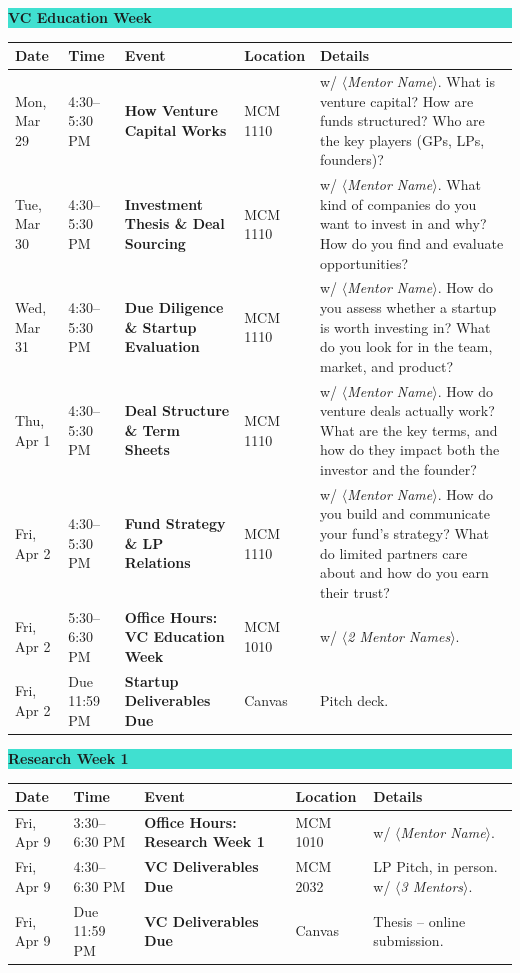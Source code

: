 \documentclass[11pt]{article}
\newcommand{\weekheader}[1]{%
  \vspace{4pt}
  \noindent
  \colorbox{turquoise}{\parbox{\dimexpr\textwidth-2\fboxsep}{\bfseries\large #1}}
  \vspace{6pt}
}
\newcommand{\deliverable}[2]{\colorbox{#1}{\textbf{#2}}}
\newcommand{\entry}[5]{%
  #1 & #2 & \textbf{#3} & #4 & #5 \\
}
\begin{document}
\weekheader{VC Education Week}
\begin{longtable}{L{2.2cm} L{2.2cm} L{4.5cm} L{1.7cm} L{4.7cm}}
\toprule
{}
\textbf{Date} & \textbf{Time} & \textbf{Event} & \textbf{Location} & \textbf{Details} \\
\midrule
\entry{Mon, Mar 29}{4:30--5:30 PM}{How Venture Capital Works}{MCM 1110}{w/ \textit{$\langle$Mentor Name$\rangle$}. What is venture capital? How are funds structured? Who are the key players (GPs, LPs, founders)?}
\addlinespace
\entry{Tue, Mar 30}{4:30--5:30 PM}{Investment Thesis \& Deal Sourcing}{MCM 1110}{w/ \textit{$\langle$Mentor Name$\rangle$}. What kind of companies do you want to invest in and why? How do you find and evaluate opportunities?}
\addlinespace
\entry{Wed, Mar 31}{4:30--5:30 PM}{Due Diligence \& Startup Evaluation}{MCM 1110}{w/ \textit{$\langle$Mentor Name$\rangle$}. How do you assess whether a startup is worth investing in? What do you look for in the team, market, and product?}
\addlinespace
\entry{Thu, Apr 1}{4:30--5:30 PM}{Deal Structure \& Term Sheets}{MCM 1110}{w/ \textit{$\langle$Mentor Name$\rangle$}. How do venture deals actually work? What are the key terms, and how do they impact both the investor and the founder?}
\addlinespace
\entry{Fri, Apr 2}{4:30--5:30 PM}{Fund Strategy \& LP Relations}{MCM 1110}{w/ \textit{$\langle$Mentor Name$\rangle$}. How do you build and communicate your fund's strategy? What do limited partners care about and how do you earn their trust?}
\addlinespace
\entry{Fri, Apr 2}{5:30--6:30 PM}{Office Hours: VC Education Week}{MCM 1010}{w/ \textit{$\langle$2 Mentor Names$\rangle$}.}
\addlinespace
\entry{Fri, Apr 2}{Due 11:59 PM}{\deliverable{trackstartup}{Startup Deliverables Due}}{Canvas}{Pitch deck.}
\bottomrule
\end{longtable}

\weekheader{Research Week 1}
\begin{longtable}{L{2.2cm} L{2.2cm} L{4.5cm} L{1.7cm} L{4.7cm}}
\toprule
{}
\textbf{Date} & \textbf{Time} & \textbf{Event} & \textbf{Location} & \textbf{Details} \\
\midrule
\entry{Fri, Apr 9}{3:30--6:30 PM}{Office Hours: Research Week 1}{MCM 1010}{w/ \textit{$\langle$Mentor Name$\rangle$}.}
\addlinespace
\entry{Fri, Apr 9}{4:30--6:30 PM}{\deliverable{trackvc}{VC Deliverables Due}}{MCM 2032}{LP Pitch, in person. w/ \textit{$\langle$3 Mentors$\rangle$}.}
\addlinespace
\entry{Fri, Apr 9}{Due 11:59 PM}{\deliverable{trackvc}{VC Deliverables Due}}{Canvas}{Thesis -- online submission.}
\bottomrule
\end{longtable}
\end{document}
